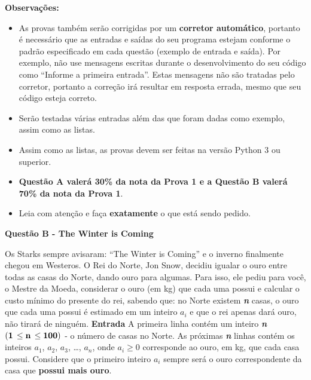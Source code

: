 \documentclass[a4paper, 12pt]{article}
\begin{document}
\textbf{{\large Observações:}}
\begin{itemize}
	\item As provas também serão corrigidas por um \textbf{corretor automático}, portanto é necessário que as entradas e saídas do seu programa estejam conforme o padrão especificado em cada questão (exemplo de entrada e saída). Por exemplo, não use mensagens escritas durante o desenvolvimento do seu código como “Informe a primeira entrada”. Estas mensagens não são tratadas pelo corretor, portanto a correção irá resultar em resposta errada, mesmo que seu código esteja correto.
	\item Serão testadas várias entradas além das que foram dadas como exemplo, assim como as listas.
	\item Assim como as listas, as provas devem ser feitas na versão Python 3 ou superior.
	\item \textbf{Questão A valerá 30\% da nota da Prova 1 e a Questão B valerá 70\% da nota da Prova 1}.
	\item Leia com atenção e faça \textbf{exatamente} o que está sendo pedido.
\end{itemize}
\newpage %
\begin{center}
\textbf{{\Large Questão B - The Winter is Coming}}
\end{center}
\vspace{5pt}
Os Starks sempre avisaram: ``The Winter is Coming'' e o inverno finalmente chegou em Westeros. O Rei do Norte, Jon Snow, decidiu igualar o ouro entre todas as casas do Norte, dando ouro para algumas. Para isso, ele pediu para você, o Mestre da Moeda, considerar o ouro (em kg) que cada uma possui e calcular o custo mínimo do presente do rei, sabendo que: no Norte existem \textbf{\textit{n}} casas, o ouro que cada uma possui é estimado em um inteiro $a_i$ e que o rei apenas dará ouro, não tirará de ninguém.
\newline \newline
\textbf{{\large Entrada}} \newline
A primeira linha contém um inteiro \textbf{\textit{n}}
 $(\textrm{\textbf{1}}\, \leq \textrm{\textbf{n}}\, \leq \textrm{\textbf{100}})$ - o número de casas no Norte.
As próximas \textbf{\textit{n}} linhas contém os inteiros $a_1$, $a_2$, $a_3$, \dots, $a_n$, onde 
$a_i \geq 0$ corresponde ao ouro, em kg, que cada casa possui. Considere que o primeiro inteiro $a_i$ sempre será o ouro correspondente da casa que \textbf{possui mais ouro}.
\newline \newline
\end{document}
